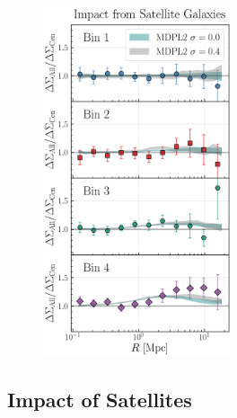 \documentclass[a4paper,fleqn,usenatbib]{mnras}
\begin{document}
  \begin{figure}
      \centering 
      \includegraphics[width=0.49\textwidth]{figure/dsigma_sat_ratio}
      \caption{
          }
      \label{fig:satellite}
  \end{figure}

\subsection{Impact of Satellites}
    \label{sec:satellite}

\end{document}
